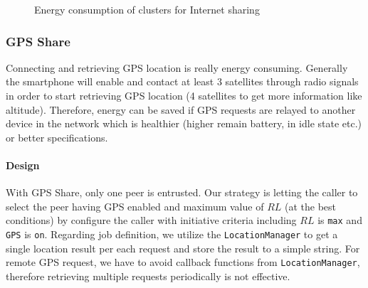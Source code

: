 \documentclass[conference]{IEEEtran}
\begin{document}
\begin{figure}[H]
	\hspace*{0.25cm}
	\caption{Energy consumption of clusters for Internet sharing}
	\label{fig:net_cluster_energy}
\end{figure}

\subsubsection{GPS Share}
Connecting and retrieving GPS location is really energy consuming. Generally the smartphone will enable and contact at least 3 satellites through radio signals in order to start retrieving GPS location (4 satellites to get more information like altitude). Therefore, energy can be saved if GPS requests are relayed to another device in the network which is healthier (higher remain battery, in idle state etc.) or better specifications.


\paragraph{Design}
With GPS Share, only one peer is entrusted. Our strategy is letting the caller to select the peer having GPS enabled and maximum value of $RL$ (at the best conditions) by configure the caller with initiative criteria including $RL$ is \texttt{max} and \texttt{GPS} is \texttt{on}. Regarding job definition, we utilize the \texttt{LocationManager} to get a single location result per each request and store the result to a simple string. For remote GPS request, we have to avoid callback functions from \texttt{LocationManager}, therefore retrieving multiple requests periodically is not effective.
\end{document}

